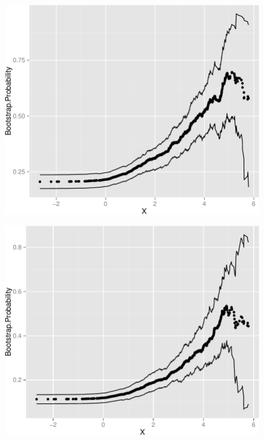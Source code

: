 \documentclass[11pt,]{article}
\begin{document}
\begin{figure}[htbp]
\centering
\includegraphics{manuscript_files/figure-latex/epa_child_cp_plot-1.pdf}
\caption{}
\end{figure}

\newpage

\begin{figure}[htbp]
\centering
\includegraphics{manuscript_files/figure-latex/who_drink_cp_plot-1.pdf}
\caption{}
\end{figure}

\newpage
\end{document}
